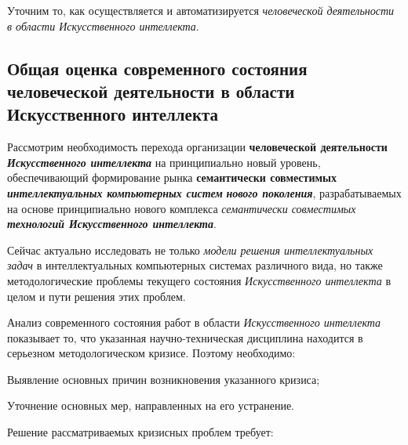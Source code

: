 Уточним то, как осуществляется и автоматизируется  \textit{человеческой деятельности в области Искусственного интеллекта}.

\subsection{Общая оценка современного состояния человеческой деятельности в области Искусственного интеллекта}
\label{subsec_general_assessment_current_state_human_activity}

Рассмотрим необходимость перехода организации \textbf{человеческой деятельности} \textbf{\textit{Искусственного интеллекта}} на принципиально новый уровень, обеспечивающий формирование рынка \textbf{семантически совместимых} \textbf{\textit{интеллектуальных компьютерных систем}} \textbf{\textit{нового поколения}}, разрабатываемых на основе принципиально нового комплекса \textit{семантически совместимых} \textbf{\textit{технологий Искусственного интеллекта}}.

Сейчас актуально исследовать не только \textit{модели решения интеллектуальных задач} в интеллектуальных компьютерных системах различного вида, но также методологические проблемы текущего состояния \textit{Искусственного интеллекта} в целом и пути решения этих проблем.

Анализ современного состояния работ в области \textit{Искусственного интеллекта} показывает то, что указанная научно-техническая дисциплина находится в серьезном методологическом кризисе. Поэтому необходимо:

\begin{textitemize}
	\item
	Выявление основных причин возникновения указанного кризиса;
	\item
	Уточнение основных мер, направленных на его устранение.
\end{textitemize}

Решение рассматриваемых кризисных проблем требует:

